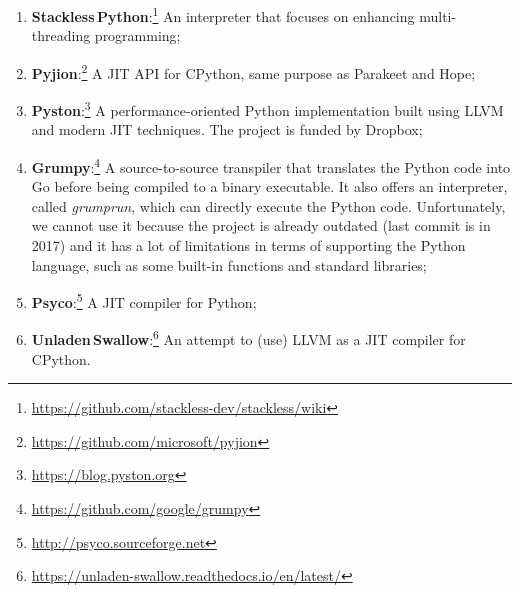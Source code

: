 \begin{enumerate}
    \item \textbf{Stackless\,Python}:\footnote{\url{https://github.com/stackless-dev/stackless/wiki}}
          An interpreter that focuses on enhancing multi-threading programming;
    \item \textbf{Pyjion}:\footnote{\url{https://github.com/microsoft/pyjion}}
          A JIT API for CPython, same purpose as Parakeet and Hope;
    \item \textbf{Pyston}:\footnote{\url{https://blog.pyston.org}}
          A performance-oriented Python implementation built using LLVM and modern JIT techniques.
          The project is funded by Dropbox;
    \item \textbf{Grumpy}:\footnote{\url{https://github.com/google/grumpy}}
          A source-to-source transpiler that translates the Python code into Go before being compiled to a binary executable.
          It also offers an interpreter, called \emph{grumprun}, which can directly execute the Python code.
          Unfortunately, we cannot use it because the project is already outdated (last commit is in 2017) and it has a lot of limitations in terms of supporting the Python language, such as some built-in functions and standard libraries;
    \item \textbf{Psyco}:\footnote{\url{http://psyco.sourceforge.net}}
          A JIT compiler for Python;
    \item \textbf{Unladen\,Swallow}:\footnote{\url{https://unladen-swallow.readthedocs.io/en/latest/}}
          An attempt to (use) LLVM as a JIT compiler for CPython.
\end{enumerate}


